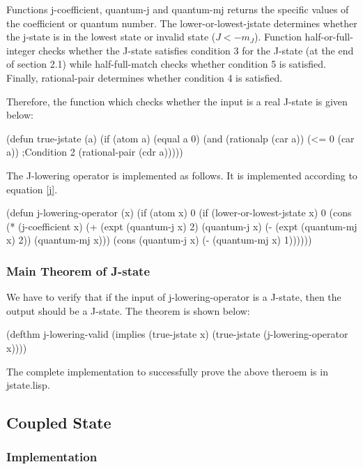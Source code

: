 \documentclass[12pt,journal,compsoc]{IEEEtran}
\begin{document}
Functions j-coefficient, quantum-j and quantum-mj returns the specific values of the coefficient or quantum number. The lower-or-lowest-jstate determines whether the j-state is in the lowest state or invalid state ($J<-m_J$). Function half-or-full-integer checks whether the J-state satisfies condition 3 for the J-state (at the end of section 2.1) while half-full-match checks whether condition 5 is satisfied. Finally, rational-pair determines whether condition 4 is satisfied.

Therefore, the function which checks whether the input is a real J-state is given below: 

\begin{acl2-lst}
(defun true-jstate (a)
  (if (atom a)
      (equal a 0)
      (and (rationalp (car a))
	   (<= 0 (car a))  ;Condition 2
	   (rational-pair (cdr a)))))
\end{acl2-lst}

The J-lowering operator is implemented as follows. It is implemented according to equation \ref{j}. 

\begin{acl2-lst}
(defun j-lowering-operator (x) 
  (if (atom x)
      0
    (if (lower-or-lowest-jstate x)
	0
       (cons (* (j-coefficient x)
		(+ (expt (quantum-j x) 2) 
		  (quantum-j x)
		  (- (expt (quantum-mj x) 2))
		  (quantum-mj x)))
	  (cons (quantum-j x)
	     (- (quantum-mj x) 1))))))
\end{acl2-lst}

\subsubsection{Main Theorem of J-state}

We have to verify that if the input of j-lowering-operator is a J-state, then the output should be a J-state. The theorem is shown below:

 \begin{acl2-lst}
(defthm j-lowering-valid 
  (implies (true-jstate x)
	   (true-jstate 
	    (j-lowering-operator x))))
\end{acl2-lst}

The complete implementation to successfully prove the above theroem is in  jstate.lisp.

\subsection{Coupled State}

\subsubsection{Implementation}
\end{document}

